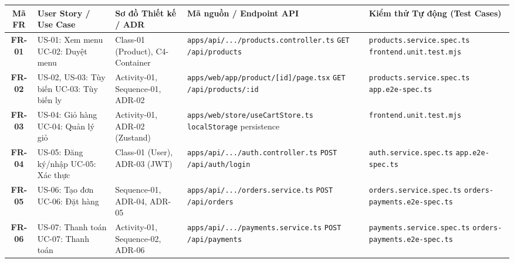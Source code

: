 \documentclass[11pt,a4paper]{article}
\begin{document}
\begin{table}[H]
\centering
\footnotesize
\renewcommand{\arraystretch}{0.88}
\begin{tabularx}{\linewidth}{|c|p{2.6cm}|p{2.4cm}|p{3.4cm}|Y|}
\hline
{}
\textbf{Mã FR} & \textbf{User Story / Use Case} & \textbf{Sơ đồ Thiết kế / ADR} & \textbf{Mã nguồn / Endpoint API} & \textbf{Kiểm thử Tự động (Test Cases)} \\ \hline
\textbf{FR-01} & US-01: Xem menu \newline UC-02: Duyệt menu & Class-01 (Product), C4-Container & \texttt{apps/api/.../products.controller.ts} \newline \texttt{GET /api/products} & \texttt{products.service.spec.ts} \newline \texttt{frontend.unit.test.mjs} \\ \hline
\textbf{FR-02} & US-02, US-03: Tùy biến \newline UC-03: Tùy biến ly & Activity-01, Sequence-01, ADR-02 & \texttt{apps/web/app/product/[id]/page.tsx} \newline \texttt{GET /api/products/:id} & \texttt{products.service.spec.ts} \newline \texttt{app.e2e-spec.ts} \\ \hline
\textbf{FR-03} & US-04: Giỏ hàng \newline UC-04: Quản lý giỏ & Activity-01, ADR-02 (Zustand) & \texttt{apps/web/store/useCartStore.ts} \newline \texttt{localStorage} persistence & \texttt{frontend.unit.test.mjs} \\ \hline
\textbf{FR-04} & US-05: Đăng ký/nhập \newline UC-05: Xác thực & Class-01 (User), ADR-03 (JWT) & \texttt{apps/api/.../auth.controller.ts} \newline \texttt{POST /api/auth/login} & \texttt{auth.service.spec.ts} \newline \texttt{app.e2e-spec.ts} \\ \hline
\textbf{FR-05} & US-06: Tạo đơn \newline UC-06: Đặt hàng & Sequence-01, ADR-04, ADR-05 & \texttt{apps/api/.../orders.service.ts} \newline \texttt{POST /api/orders} & \texttt{orders.service.spec.ts} \newline \texttt{orders-payments.e2e-spec.ts} \\ \hline
\textbf{FR-06} & US-07: Thanh toán \newline UC-07: Thanh toán & Activity-01, Sequence-02, ADR-06 & \texttt{apps/api/.../payments.service.ts} \newline \texttt{POST /api/payments} & \texttt{payments.service.spec.ts} \newline \texttt{orders-payments.e2e-spec.ts} \\ \hline

\end{tabularx}
\end{table}
\end{document}
